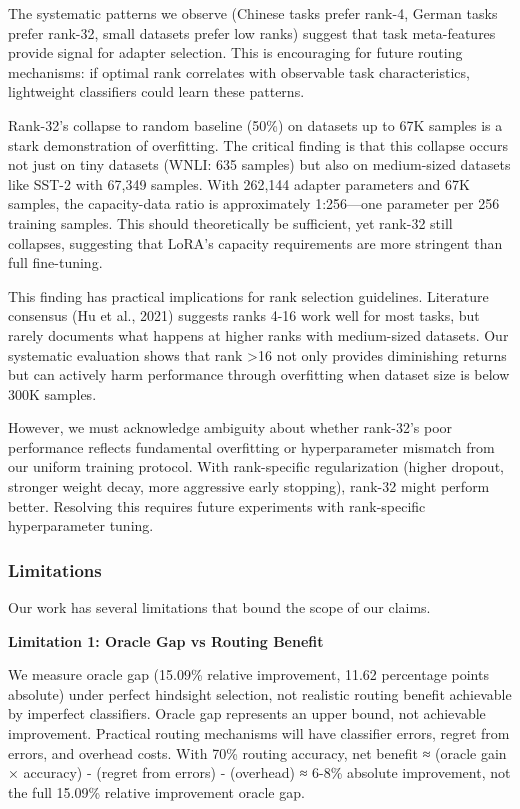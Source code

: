 The systematic patterns we observe (Chinese tasks prefer rank-4, German tasks prefer rank-32, small datasets prefer low ranks) suggest that task meta-features provide signal for adapter selection. This is encouraging for future routing mechanisms: if optimal rank correlates with observable task characteristics, lightweight classifiers could learn these patterns.

Rank-32's collapse to random baseline (50\%) on datasets up to 67K samples is a stark demonstration of overfitting. The critical finding is that this collapse occurs not just on tiny datasets (WNLI: 635 samples) but also on medium-sized datasets like SST-2 with 67,349 samples. With 262,144 adapter parameters and 67K samples, the capacity-data ratio is approximately 1:256—one parameter per 256 training samples. This should theoretically be sufficient, yet rank-32 still collapses, suggesting that LoRA's capacity requirements are more stringent than full fine-tuning.

This finding has practical implications for rank selection guidelines. Literature consensus (Hu et al., 2021) suggests ranks 4-16 work well for most tasks, but rarely documents what happens at higher ranks with medium-sized datasets. Our systematic evaluation shows that rank >16 not only provides diminishing returns but can actively harm performance through overfitting when dataset size is below 300K samples.

However, we must acknowledge ambiguity about whether rank-32's poor performance reflects fundamental overfitting or hyperparameter mismatch from our uniform training protocol. With rank-specific regularization (higher dropout, stronger weight decay, more aggressive early stopping), rank-32 might perform better. Resolving this requires future experiments with rank-specific hyperparameter tuning.

\subsubsection{Limitations}

Our work has several limitations that bound the scope of our claims.

\textbf{Limitation 1: Oracle Gap vs Routing Benefit}

We measure oracle gap (15.09\% relative improvement, 11.62 percentage points absolute) under perfect hindsight selection, not realistic routing benefit achievable by imperfect classifiers. Oracle gap represents an upper bound, not achievable improvement. Practical routing mechanisms will have classifier errors, regret from errors, and overhead costs. With 70\% routing accuracy, net benefit ≈ (oracle gain × accuracy) - (regret from errors) - (overhead) ≈ 6-8\% absolute improvement, not the full 15.09\% relative improvement oracle gap.

